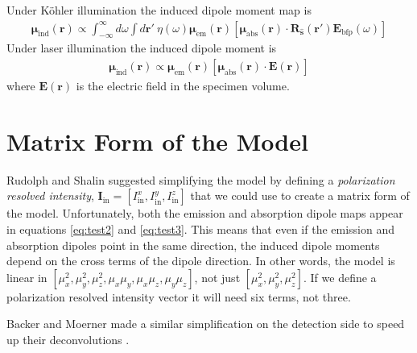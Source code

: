 \documentclass[11pt]{article}
\providecommand{\mb}[1]{\mathbf{#1}}
\providecommand{\bs}[1]{\boldsymbol{#1}}
\providecommand{\intinf}{\int_{-\infty}^{\infty}}
\begin{document}
Under K\"{ohler} illumination the induced dipole moment map is
\begin{align}
  \bs{\mu}_{\text{ind}}(\mb{r}) \propto
  \intinf d\omega
  \int d\mb{r'}\ \eta(\omega)\bs{\mu}_{\text{em}}(\mb{r})
  \left[\bs{\mu}_{\text{abs}}(\mb{r})\cdot \mb{R}_{\mb{\hat{s}}}(\mb{r'})\mb{E}_{\text{bfp}}(\omega)\right] \label{eq:test2}
\end{align}
Under laser illumination the induced dipole moment is\begin{align}
  \bs{\mu}_{\text{ind}}(\mb{r}) \propto
  \bs{\mu}_{\text{em}}(\mb{r})
  \left[\bs{\mu}_{\text{abs}}(\mb{r})\cdot \mb{E}(\mb{r})\right] \label{eq:test3}
\end{align}
where $\mb{E}(\mb{r})$ is the electric field in the specimen volume. 

\section{Matrix Form of the Model}
Rudolph and Shalin suggested simplifying the model by defining a
\textit{polarization resolved intensity},
$\mb{I}_{\text{in}} = \left[I_{\text{in}}^x, I_{\text{in}}^y,
  I_{\text{in}}^z\right]$ that we could use to create a matrix form of the
model. Unfortunately, both the emission and absorption dipole maps appear in
equations \ref{eq:test2} and \ref{eq:test3}. This means that even if the
emission and absorption dipoles point in the same direction, the induced dipole
moments depend on the cross terms of the dipole direction. In other words, the
model is linear in
$\left[\mu_x^2, \mu_y^2, \mu_z^2, \mu_{x}\mu_y, \mu_x\mu_z, \mu_y\mu_z\right]$,
not just $\left[\mu_x^2, \mu_y^2, \mu_z^2\right]$. If we define a polarization resolved intensity vector it will need six terms, not three.

Backer and Moerner made a similar simplification on the detection side to speed
up their deconvolutions \cite{backer}.

{}

\end{document}
